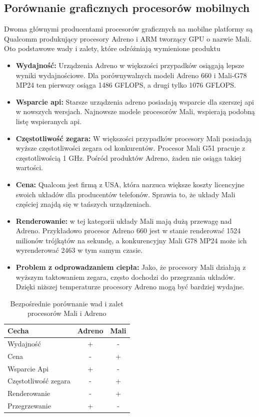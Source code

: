 \subsection[Porównanie graficznych procesorów mobilnych]{Porównanie graficznych procesorów mobilnych}
Dwoma głównymi producentami procesorów graficznych na mobilne platformy są Qualcomm produkujący procesory Adreno i ARM tworzący GPU o nazwie Mali. 
Oto podstawowe wady i zalety, które odróżniają wymienione produktu
\begin{itemize}
	\item \textbf{Wydajność:} Urządzenia Adreno w większości przypadków osiągają lepsze wyniki wydajnościowe. Dla porównywalnych modeli Adreno 660 i Mali-G78 MP24 ten pierwszy osiąga 1486 GFLOPS, a drugi tylko 1076 GFLOPS.
	\item \textbf{Wsparcie api:} Starsze urządzenia adreno posiadają wsparcie dla szerszej api w nowszych wersjach. Najnowsze modele procesorów Mali, wspierają podobną listę wspieranych api.
	\item \textbf{Częstotliwość zegara:} W większości przypadków procesory Mali posiadają wyższe częstotliwości zegara od konkurentów. Procesor Mali G51 pracuje z częstotliwością 1 GHz. Pośród produktów Adreno, żaden nie osiąga takiej wartości.
	\item \textbf{Cena:} Qualcom jest firmą z USA, która narzuca większe koszty licencyjne swoich układów dla producentów telefonów. Sprawia to, że układy Mali częściej znajdą się w tańszych urządzeniach.
	\item \textbf{Renderowanie:} w tej kategorii układy Mali mają dużą przewagę nad Adreno. Przykładowo procesor Adreno 660 jest w stanie renderować 1524 milionów trójkątów na sekundę, a konkurencyjny Mali G78 MP24 może ich wyrenderować 2463 w tym samym czasie.
	\item \textbf{Problem z odprowadzaniem ciepła:} Jako, że procesory Mali działają z wyższym taktowaniem zegara, często dochodzi do przegrzania układów. Dzięki niższej temperaturze procesory Adreno mogą być bardziej wydajne.
\end{itemize}
\begin{table}[H]
    \caption{Bezpośrednie porównanie wad i zalet procesorów Mali i Adreno}
    \label{tab:skale}
    \begin{tabular}{|l|c|c|}
\hline
Cecha & Adreno & Mali\\
\hline
Wydajność & + & -\\
\hline
Cena & - & + \\
\hline
Wsparcie Api & + & -\\
\hline
Częstotliwość zegara & - & +\\
\hline
Renderowanie & - & +\\
\hline
Przegrzewanie & + & -\\
\hline
\end{tabular}
\end{table}
	
